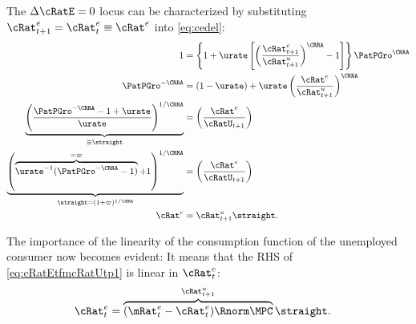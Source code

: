 \documentclass{handout}
\begin{document}
The $\dcEqZero$ locus can be characterized by substituting ${\cRat}^{e}_{t+1}={\cRat}^{e}_{t} \equiv {\cRat}^{e}$ into \eqref{eq:cedel}:
\begin{equation}\begin{gathered}\begin{aligned}
         1 & = \left\{1+\urate\left[\left(\frac{{\cRat}^{e}_{t+1}}{\cRat_{t+1}^{u}}\right)^{\CRRA}-1\right]\right\} \PatPGro^{\CRRA} \label{eq:ctp1OctEq1}
\\ \PatPGro^{-\CRRA} & =  (1-\urate)+\urate\left(\frac{{\cRat}^{e}_{\tSS}}{\cRat_{t+1}^{u} }\right)^{\CRRA}
\\ \underbrace{\left(\frac{\PatPGro^{-\CRRA}-1+\urate}{\urate}\right)^{1/\CRRA}}_{\equiv \straight} & =   \left(\frac{{\cRat}^{e}_{\tSS}}{\cRatU_{t+1}}\right) \label{eq:straightDef}
\\ \underbrace{\left(\overbrace{\urate^{-1}(\PatPGro^{-\CRRA}-1)}^{\equiv \varpi}+1\right)^{1/\CRRA}}_{\straight=(1+\varpi)^{1/\CRRA}} & =   \left(\frac{{\cRat}^{e}_{\tSS}}{\cRatU_{t+1}}\right) \label{eq:varpiDef}
\\      {\cRat}^{e}_{\tSS} & = \cRat^{u}_{t+1} \straight \label{eq:cRatEtfmcRatUtp1}.
\end{aligned}\end{gathered}\end{equation}


The importance of the linearity of the consumption function of the unemployed consumer now becomes evident:  It means that the RHS of \eqref{eq:cRatEtfmcRatUtp1} is linear in $\cRat^{e}_{t}$:
\begin{equation}\begin{gathered}\begin{aligned}
  \cRat^{e}_{t} & =  \overbrace{(\mRat^{e}_{t}-{\cRat}^{e}_{t})\Rnorm \MPCU}^{\cRat^{u}_{t+1}} \straight \label{eq:PSTerm}.
\end{aligned}\end{gathered}\end{equation}
\end{document}
